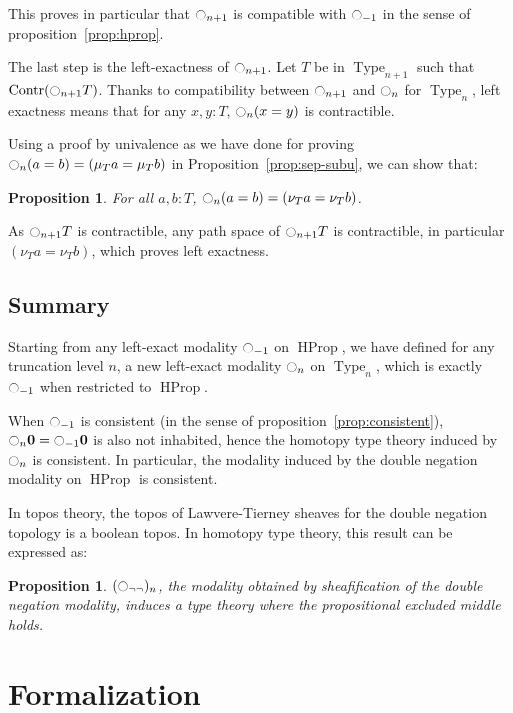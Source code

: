 \documentclass[conference]{IEEEtran}
\newtheorem{prop}[thm]{Proposition}
\newcommand{\mynote}[2]{
    \fbox{\bfseries\sffamily\scriptsize#1}
    {\small$\blacktriangleright$\textsf{\emph{#2}}$\blacktriangleleft$}~}
\newcommand\nt[1]{\mynote{NT}{#1}}
\DeclareMathOperator{\Type}{Type}
\DeclareMathOperator{\HProp}{HProp}
\DeclareMathOperator{\Contr}{Contr}
\newcommand{\modal}{\ensuremath{\ocircle}}
\newcommand \zero {\mathbf{0}}
\begin{document}
This proves in particular that $\modal_{n+1}$ is compatible with
$\modal_{-1}$ in the sense of proposition~\ref{prop:hprop}.

The last step is the left-exactness of $\modal_{n+1}$. Let
$T$ be in $\Type_{n+1}$ such that $\Contr(\modal_{n+1} T)$.
Thanks to compatibility between $\modal_{n+1}$ and $\modal_n$ for
$\Type_n$, left exactness means that for any $x,y : T$, $\modal_n(x=y)$ is contractible.

Using a proof by univalence as we have done for proving $\modal_n (a=b) = (\mu_T a =
\mu_T b)$ in Proposition~\ref{prop:sep-subu}, we can show that:
\begin{prop}
  For all $a,b:T$, $\modal_n(a=b) = (\nu_T a = \nu_T b)$.
\end{prop}

As $\modal_{n+1} T$ is contractible, any path space of $\modal_{n+1} T$ is
contractible, in particular $(\nu_T a=\nu_T b)$, which proves left
exactness. 

\subsection{Summary}
\label{ssec:summary}

Starting from any left-exact modality $\modal_{-1}$ on $\HProp$, we
have defined for any truncation level $n$, a new left-exact modality
$\modal_n$ on $\Type_n$, which is exactly $\modal_{-1}$ when
restricted to $\HProp$.


When $\modal_{-1}$ is consistent (in the sense of
proposition~\ref{prop:consistent}), 
$\modal_{n}\zero=\modal_{-1}\zero$ is also not inhabited, hence the homotopy type theory induced by
$\modal_n$ is consistent. 
%
In particular, the modality induced by the double negation modality on
$\HProp$ is consistent.

In topos theory, the topos of Lawvere-Tierney sheaves for the double
negation topology is a boolean topos. In homotopy type theory, this
result can be expressed as:

\begin{prop}
  $(\modal_{\lnot\lnot})_n$, the modality obtained by sheafification
  of the double negation modality,
  induces a type theory where the propositional excluded middle holds.
\end{prop}


\section{Formalization} 
\label{sec:formalization}
\end{document}
